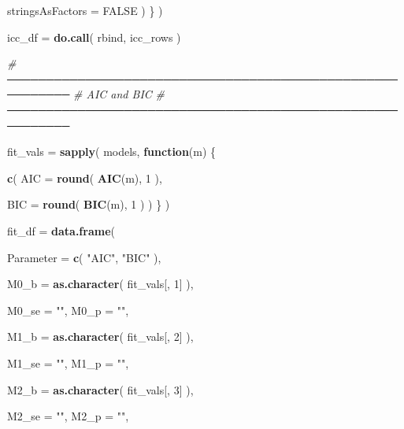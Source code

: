 \documentclass[
]{article}
\newenvironment{Shaded}{\begin{snugshade}}{\end{snugshade}}
\newcommand{\AttributeTok}[1]{\textcolor[rgb]{0.13,0.29,0.53}{#1}}
\newcommand{\CommentTok}[1]{\textcolor[rgb]{0.56,0.35,0.01}{\textit{#1}}}
\newcommand{\ConstantTok}[1]{\textcolor[rgb]{0.56,0.35,0.01}{#1}}
\newcommand{\ControlFlowTok}[1]{\textcolor[rgb]{0.13,0.29,0.53}{\textbf{#1}}}
\newcommand{\DecValTok}[1]{\textcolor[rgb]{0.00,0.00,0.81}{#1}}
\newcommand{\FunctionTok}[1]{\textcolor[rgb]{0.13,0.29,0.53}{\textbf{#1}}}
\newcommand{\NormalTok}[1]{#1}
\newcommand{\OtherTok}[1]{\textcolor[rgb]{0.56,0.35,0.01}{#1}}
\newcommand{\StringTok}[1]{\textcolor[rgb]{0.31,0.60,0.02}{#1}}
\begin{document}
\begin{Shaded}
\begin{Highlighting}[]
          \AttributeTok{stringsAsFactors =} \ConstantTok{FALSE}
\NormalTok{        )}
\NormalTok{      \}}
\NormalTok{    )}


\NormalTok{  icc\_df }\OtherTok{=}
    \FunctionTok{do.call}\NormalTok{(}
\NormalTok{      rbind,}
\NormalTok{      icc\_rows}
\NormalTok{    )}


  \CommentTok{\# ──────────────────────────────────────────────────────────}
  \CommentTok{\# AIC and BIC}
  \CommentTok{\# ──────────────────────────────────────────────────────────}

\NormalTok{  fit\_vals }\OtherTok{=}
    \FunctionTok{sapply}\NormalTok{(}
\NormalTok{      models,}
      \ControlFlowTok{function}\NormalTok{(m) \{}

        \FunctionTok{c}\NormalTok{(}
          \AttributeTok{AIC =} \FunctionTok{round}\NormalTok{(}
            \FunctionTok{AIC}\NormalTok{(m),}
            \DecValTok{1}
\NormalTok{          ),}

          \AttributeTok{BIC =} \FunctionTok{round}\NormalTok{(}
            \FunctionTok{BIC}\NormalTok{(m),}
            \DecValTok{1}
\NormalTok{          )}
\NormalTok{        )}
\NormalTok{      \}}
\NormalTok{    )}


\NormalTok{  fit\_df }\OtherTok{=}
    \FunctionTok{data.frame}\NormalTok{(}

      \AttributeTok{Parameter =}
        \FunctionTok{c}\NormalTok{(}
          \StringTok{"AIC"}\NormalTok{,}
          \StringTok{"BIC"}
\NormalTok{        ),}

      \AttributeTok{M0\_b =}
        \FunctionTok{as.character}\NormalTok{(}
\NormalTok{          fit\_vals[, }\DecValTok{1}\NormalTok{]}
\NormalTok{        ),}

      \AttributeTok{M0\_se =} \StringTok{""}\NormalTok{,}
      \AttributeTok{M0\_p =} \StringTok{""}\NormalTok{,}

      \AttributeTok{M1\_b =}
        \FunctionTok{as.character}\NormalTok{(}
\NormalTok{          fit\_vals[, }\DecValTok{2}\NormalTok{]}
\NormalTok{        ),}

      \AttributeTok{M1\_se =} \StringTok{""}\NormalTok{,}
      \AttributeTok{M1\_p =} \StringTok{""}\NormalTok{,}

      \AttributeTok{M2\_b =}
        \FunctionTok{as.character}\NormalTok{(}
\NormalTok{          fit\_vals[, }\DecValTok{3}\NormalTok{]}
\NormalTok{        ),}

      \AttributeTok{M2\_se =} \StringTok{""}\NormalTok{,}
      \AttributeTok{M2\_p =} \StringTok{""}\NormalTok{,}


\end{Highlighting}
\end{Shaded}
\end{document}
